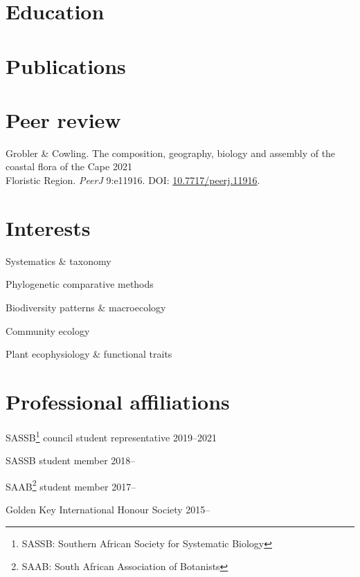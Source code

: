 \documentclass[10pt]{article}
\begin{document}

\section*{Education} %



\section*{Publications} %



\section*{Peer review} %

Grobler \& Cowling. The composition, geography, biology and assembly of the
  coastal flora of the Cape                                       \hfill 2021 \\
  \hspace{2em} Floristic Region. \textit{PeerJ} 9:e11916. DOI:
    \href{https://doi.org/10.7717/peerj.11916}{10.7717/peerj.11916}.

\hfill

\begin{multicols}{2}

\section*{Interests} %
    
Systematics \& taxonomy

Phylogenetic comparative methods

Biodiversity patterns \& macroecology

Community ecology

Plant ecophysiology \& functional traits

\section*{Professional affiliations} %

SASSB\footnote{SASSB: Southern African Society for Systematic Biology}
council student representative                                 \hfill 2019--2021

SASSB student member                                               \hfill 2018--

SAAB\footnote{SAAB: South African Association of Botanists}
student member                                                     \hfill 2017--

Golden Key International Honour Society                            \hfill 2015--

\end{multicols}
\end{document}
